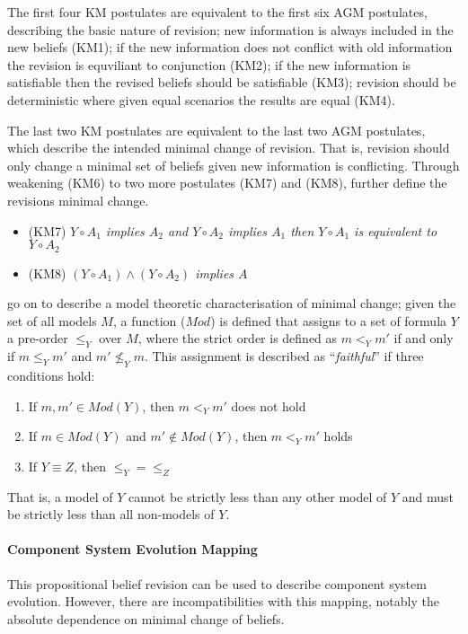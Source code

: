 The first four KM postulates are equivalent to the first six AGM postulates, describing the basic nature of revision;
new information is always included in the new beliefs (KM1); if the new information does not conflict with old information the revision is equviliant to conjunction (KM2);
if the new information is satisfiable then the revised beliefs should be satisfiable (KM3); revision should be deterministic where given equal scenarios the results are equal (KM4).

The last two KM postulates are equivalent to the last two AGM postulates, which describe the intended minimal change of revision.
That is, revision should only change a minimal set of beliefs given new information is conflicting.
Through weakening (KM6) to two more postulates (KM7) and (KM8), \cite{katsuno1991propositional} further define the revisions minimal change.

\begin{itemize}
  \item (KM7) \textit{ $Y \circ A_1$  implies $A_2$ and $Y \circ A_2$ implies $A_1$ then $Y \circ A_1$ is equivalent to $Y \circ A_2$}
  \item (KM8) \textit{ $(Y \circ A_1) \wedge (Y \circ A_2)$ implies $A$}
\end{itemize}

\cite{katsuno1991propositional} go on to describe a model theoretic characterisation of minimal change; 
given the set of all models $M$, a function ($Mod$) is defined that assigns to a set of formula $Y$ a pre-order $\leq_{Y}$ over $M$,
where the strict order is defined as $m <_Y m'$ if and only if $m \leq_Y m'$ and $m' \not \leq_Y m$. 
This assignment is described as ``\textit{faithful}'' if three conditions hold:
\begin{enumerate}
  \item If $m,m' \in Mod(Y)$, then $m <_Y m'$ does not hold
  \item If $m \in Mod(Y)$ and $m' \not\in Mod(Y)$, then $m <_Y m'$ holds
  \item If $Y \equiv Z$, then $\leq_Y = \leq_Z$  
\end{enumerate}

That is, a model of $Y$ cannot be strictly less than any other model of $Y$ and must be strictly less than all non-models of $Y$.

\paragraph{Component System Evolution Mapping}
This propositional belief revision can be used to describe component system evolution.
However, there are incompatibilities with this mapping, notably the absolute dependence on minimal change of beliefs. 

